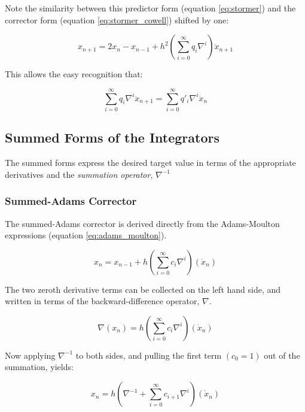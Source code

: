 Note the similarity between this predictor form (equation \ref{eq:stormer}) 
and the corrector form (equation \ref{eq:stormer_cowell}) shifted by one:

\begin{equation*}
x_{n+1}=2x_{n}-x_{n-1}+h^{2}(\sum _{i=0}^{\infty
}q_{i}\nabla ^{i}){\ddot{x}}_{n+1}
\end{equation*}

This allows the easy recognition that:


\begin{equation} \label{eq:q_qprime}
\sum _{i=0}^{\infty }q_{i}\nabla ^{i}{\ddot{x}}_{n+1} =
\sum _{i=0}^{\infty}q'_{i}\nabla ^{i}{\ddot{x}}_{n}
\end{equation}

\subsection{Summed Forms of the Integrators}

The summed forms express the desired target value in terms of the appropriate
derivatives and the \textit{summation operator}, $\nabla^{-1}$

\subsubsection{Summed-Adams Corrector}

The summed-Adams corrector is derived directly from the Adams-Moulton
expressions (equation \ref{eq:adams_moulton}).

\begin{equation*}
x_{n}=x_{n-1}+h\left(\sum _{i=0}^{\infty
}c_{i}\nabla ^{i}\right)(\dot{x}_{n})
\end{equation*}

The two zeroth derivative terms can
be collected on the left hand side, and written in terms of the
backward-difference operator,  $\nabla $.

\begin{equation*}
\nabla (x_{n})=h\left(\sum _{i=0}^{\infty }c_{i}\nabla ^{i}\right)(\dot{x}_{n})
\end{equation*}

Now applying  $\nabla ^{-1}$ to both sides, and pulling the first term
$(c_{0}=1)$ out of the summation, yields:

\begin{equation*}
x_{n}=h\left(\nabla ^{-1}+\sum _{i=0}^{\infty}c_{i+1}\nabla ^{i}\right)(\dot{x}_{n})
\end{equation*}

